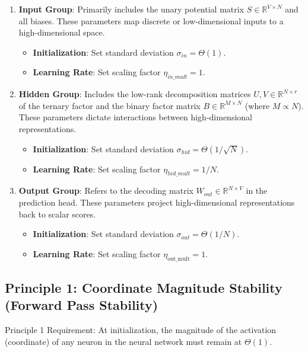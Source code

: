 \documentclass[11pt]{article}
\begin{document}
\begin{enumerate}
    \item \textbf{Input Group}: Primarily includes the unary potential matrix $S \in \mathbb{R}^{V \times N}$ and all biases. These parameters map discrete or low-dimensional inputs to a high-dimensional space.
    \begin{itemize}
        \item \textbf{Initialization}: Set standard deviation $\sigma_{in} = \Theta(1)$.
        \item \textbf{Learning Rate}: Set scaling factor $\eta_{in\_mult} = 1$.
    \end{itemize}

    \item \textbf{Hidden Group}: Includes the low-rank decomposition matrices $U, V \in \mathbb{R}^{N \times r}$ of the ternary factor and the binary factor matrix $B \in \mathbb{R}^{M \times N}$ (where $M \propto N$). These parameters dictate interactions between high-dimensional representations.
    \begin{itemize}
        \item \textbf{Initialization}: Set standard deviation $\sigma_{hid} = \Theta(1/\sqrt{N})$.
        \item \textbf{Learning Rate}: Set scaling factor $\eta_{hid\_mult} = 1/N$.
    \end{itemize}

    \item \textbf{Output Group}: Refers to the decoding matrix $W_{out} \in \mathbb{R}^{N \times V}$ in the prediction head. These parameters project high-dimensional representations back to scalar scores.
    \begin{itemize}
        \item \textbf{Initialization}: Set standard deviation $\sigma_{out} = \Theta(1/N)$.
        \item \textbf{Learning Rate}: Set scaling factor $\eta_{\text{out\_mult}} = 1$.
    \end{itemize}
\end{enumerate}

\subsection{Principle 1: Coordinate Magnitude Stability (Forward Pass Stability)}

Principle 1 Requirement: At initialization, the magnitude of the activation (coordinate) of any neuron in the neural network must remain at $\Theta(1)$.
\end{document}
